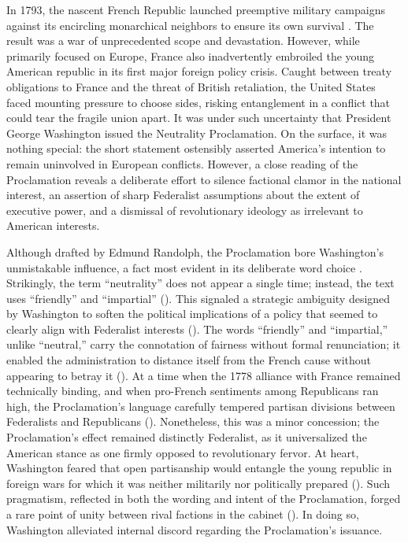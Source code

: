 \documentclass[12pt, a4paper, twoside]{article}
\begin{document}
\maketitle{}

In 1793, the nascent French Republic launched preemptive military campaigns against its encircling monarchical neighbors to ensure its own survival \autocite{holland1911}. The result was a war of unprecedented scope and devastation. However, while primarily focused on Europe, France also inadvertently embroiled the young American republic in its first major foreign policy crisis. Caught between treaty obligations to France and the threat of British retaliation, the United States faced mounting pressure to choose sides, risking entanglement in a conflict that could tear the fragile union apart. It was under such uncertainty that President George Washington issued the Neutrality Proclamation. On the surface, it was nothing special: the short statement ostensibly asserted America’s intention to remain uninvolved in European conflicts. However, a close reading of the Proclamation reveals a deliberate effort to silence factional clamor in the national interest, an assertion of sharp Federalist assumptions about the extent of executive power, and a dismissal of revolutionary ideology as irrelevant to American interests. 

Although drafted by Edmund Randolph, the Proclamation bore Washington’s unmistakable influence, a fact most evident in its deliberate word choice \autocite[p.\ 59]{moats2021}. Strikingly, the term “neutrality” does not appear a single time; instead, the text uses “friendly” and “impartial” (\cite{washington1793}). This signaled a strategic ambiguity designed by Washington to soften the political implications of a policy that seemed to clearly align with Federalist interests (\cite[p.\ 71]{reinstein2011}). The words “friendly” and “impartial,” unlike “neutral,” carry the connotation of fairness without formal renunciation; it enabled the administration to distance itself from the French cause without appearing to betray it (\cite[p.\ 65]{moats2021}). At a time when the 1778 alliance with France remained technically binding, and when pro-French sentiments among Republicans ran high, the Proclamation’s language carefully tempered partisan divisions between Federalists and Republicans (\cite[p.\ 223, 215]{reinstein2011}). Nonetheless, this was a minor concession; the Proclamation’s effect remained distinctly Federalist, as it universalized the American stance as one firmly opposed to revolutionary fervor. At heart, Washington feared that open partisanship would entangle the young republic in foreign wars for which it was neither militarily nor politically prepared (\cite[pp.\ 470–471]{sheridan1994}). Such pragmatism, reflected in both the wording and intent of the Proclamation, forged a rare point of unity between rival factions in the cabinet (\cite[pp.\ 689–691]{chernow2011}). In doing so, Washington alleviated internal discord regarding the Proclamation’s issuance. 
\end{document}
